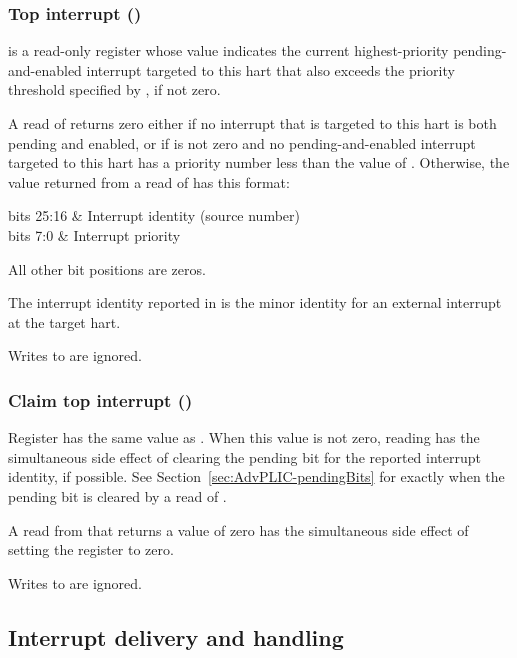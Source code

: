 \subsubsection{Top interrupt ()}

 is a read-only register whose value indicates the current
highest-priority pending-and-enabled interrupt targeted to this hart
that also exceeds the priority threshold specified by ,
if not zero.

A read of  returns zero either if no interrupt that is targeted
to this hart is both pending and enabled, or if  is not
zero and no pending-and-enabled interrupt targeted to this hart has a
priority number less than the value of .
Otherwise, the value returned from a read of  has this format:
\begin{displayLinesTable}[l@{\ \quad}l]
bits 25:16 & Interrupt identity (source number) \\
bits 7:0   & Interrupt priority \\
\end{displayLinesTable}
All other bit positions are zeros.

The interrupt identity reported in  is the minor identity for
an external interrupt at the target hart.

Writes to  are ignored.

\subsubsection{Claim top interrupt ()}

Register  has the same value as .
When this value is not zero, reading  has the simultaneous
side effect of clearing the pending bit for the reported interrupt
identity, if possible.
See Section~\ref{sec:AdvPLIC-pendingBits} for exactly when the pending
bit is cleared by a read of .

A read from  that returns a value of zero has the simultaneous
side effect of setting the  register to zero.

Writes to  are ignored.

\subsection{Interrupt delivery and handling}
\label{sec:AdvPLIC-directMode-intrDelivery}

